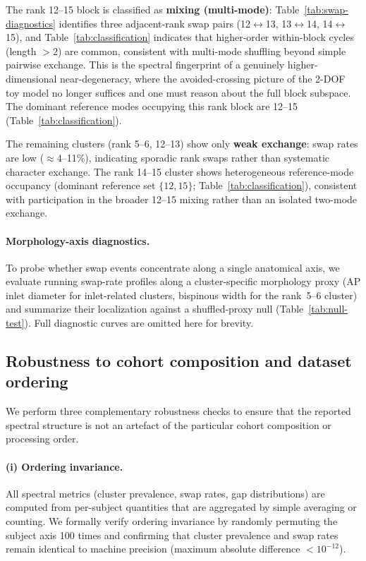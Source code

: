 \documentclass[11pt]{article}
\begin{document}
The rank 12--15 block is classified as \textbf{mixing (multi-mode)}: Table~\ref{tab:swap-diagnostics} identifies three adjacent-rank swap pairs (12${\leftrightarrow}$13, 13${\leftrightarrow}$14, 14${\leftrightarrow}$15), and Table~\ref{tab:classification} indicates that higher-order within-block cycles (length $>2$) are common, consistent with multi-mode shuffling beyond simple pairwise exchange.
This is the spectral fingerprint of a genuinely higher-dimensional near-degeneracy, where the avoided-crossing picture of the 2-DOF toy model no longer suffices and one must reason about the full block subspace.
The dominant reference modes occupying this rank block are 12--15 (Table~\ref{tab:classification}).

The remaining clusters (rank 5--6, 12--13) show only \textbf{weak exchange}: swap rates are low ($\approx 4$--11\%), indicating sporadic rank swaps rather than systematic character exchange.
The rank 14--15 cluster shows heterogeneous reference-mode occupancy (dominant reference set $\{12,15\}$; Table~\ref{tab:classification}), consistent with participation in the broader 12--15 mixing rather than an isolated two-mode exchange.

\paragraph{Morphology-axis diagnostics.}
To probe whether swap events concentrate along a single anatomical axis, we evaluate running swap-rate profiles along a cluster-specific morphology proxy (AP inlet diameter for inlet-related clusters, bispinous width for the rank~5--6 cluster) and summarize their localization against a shuffled-proxy null (Table~\ref{tab:null-test}).
Full diagnostic curves are omitted here for brevity.

\subsection{Robustness to cohort composition and dataset ordering}
\label{sec:robustness}

We perform three complementary robustness checks to ensure that the reported spectral structure is not an artefact of the particular cohort composition or processing order.

\paragraph{(i) Ordering invariance.}
All spectral metrics (cluster prevalence, swap rates, gap distributions) are computed from per-subject quantities that are aggregated by simple averaging or counting.
We formally verify ordering invariance by randomly permuting the subject axis 100 times and confirming that cluster prevalence and swap rates remain identical to machine precision (maximum absolute difference $< 10^{-12}$).
\end{document}
